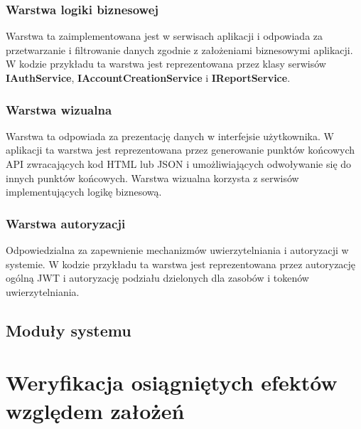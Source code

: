 \documentclass[12pt,a4paper,oneside]{article}
\begin{document}
\subsubsection{Warstwa logiki biznesowej}
Warstwa ta zaimplementowana jest w serwisach aplikacji i odpowiada za
przetwarzanie i filtrowanie danych zgodnie z założeniami biznesowymi aplikacji.
W kodzie przykładu ta warstwa jest reprezentowana przez klasy serwisów
\textbf{IAuthService}, \textbf{IAccountCreationService} i \textbf{IReportService}.

\subsubsection{Warstwa wizualna}
Warstwa ta odpowiada za prezentację danych w interfejsie użytkownika. 
W aplikacji ta warstwa jest reprezentowana przez generowanie punktów końcowych 
API zwracających kod HTML lub JSON i umożliwiających odwoływanie się do innych 
punktów końcowych. Warstwa wizualna korzysta z serwisów implementujących logikę 
biznesową.

\subsubsection{Warstwa autoryzacji}
Odpowiedzialna za zapewnienie mechanizmów uwierzytelniania i autoryzacji w 
systemie. W kodzie przykładu ta warstwa jest reprezentowana przez autoryzację 
ogólną JWT i autoryzację podziału dzielonych dla zasobów i tokenów 
uwierzytelniania.

\subsection{Moduły systemu}

\section{Weryfikacja osiągniętych efektów względem założeń}
\end{document}
